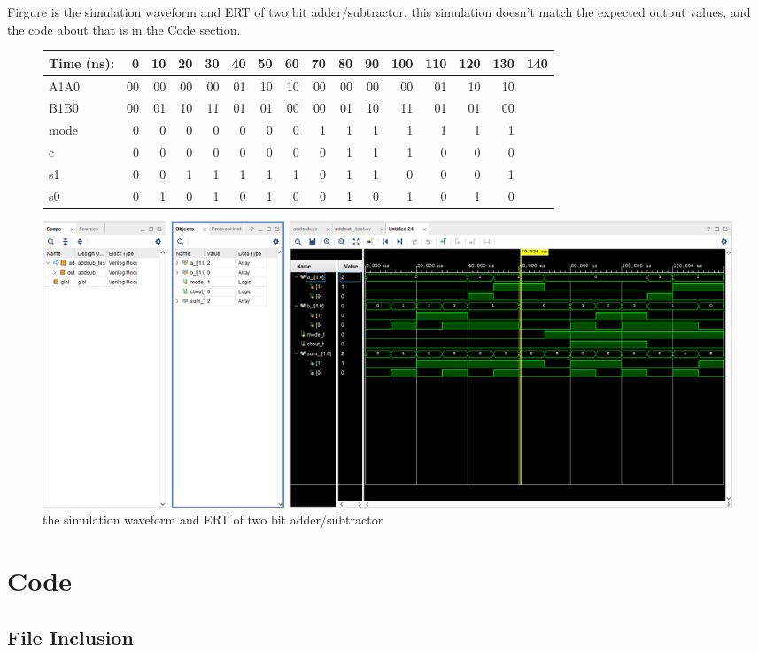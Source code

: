 \documentclass[11pt]{article}
\newcommand{\Verilog}[2][]{%
	
}
\begin{document}
Firgure is the simulation waveform and ERT of two bit adder/subtractor, this simulation doesn't match the expected output values, and the code about that is in the Code section. \\
\begin{figure}[ht]\centering
	\begin{tabular}{l|rrrr|rrrr|rrrr|rr}
		Time (ns): & 0 & 10 & 20 & 30 & 40 & 50 & 60 & 70 & 80 & 90 & 100 & 110 & 120 & 130 & 140 \\
		\midrule
		A1A0 & 00 & 00 & 00 & 00 & 01 & 10 & 10 & 00 & 00 & 00 & 00 & 01 & 10 & 10 \\
		B1B0 & 00 & 01 & 10 & 11 & 01 & 01 & 00 & 00 & 01 & 10 & 11 & 01 & 01 & 00 \\
		mode & 0 & 0 & 0 & 0 & 0 & 0 & 0 & 1 & 1 & 1 & 1 & 1 & 1 & 1 \\
		\midrule
		c & 0 & 0 & 0 & 0 & 0 & 0 & 0 & 0 & 1 & 1 & 1 & 0 & 0 & 0 \\
		s1 & 0 & 0 & 1 & 1 & 1 & 1 & 1 & 0 & 1 & 1 & 0 & 0 & 0 & 1 \\
		s0 & 0 & 1 & 0 & 1 & 0 & 1 & 0 & 0 & 1 & 0 & 1 & 0 & 1 & 0 \\
		\bottomrule
	\end{tabular}\medskip
		
	\includegraphics{AddSubSimulation}
	\caption{the simulation waveform and ERT of two bit adder/subtractor}
	\label{fig:AddSubSimulation}
\end{figure}



\section*{Code}

\subsection*{File Inclusion}
\Verilog[caption=Half Adder Verilog code,label=code:file_ex]{halfadder.sv}
\end{document}
